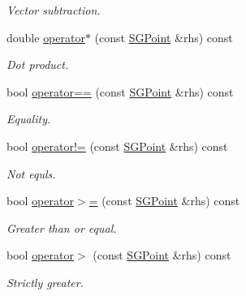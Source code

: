 \begin{DoxyCompactItemize}
\begin{DoxyCompactList}\small\item\em Vector subtraction. \end{DoxyCompactList}\item 
\mbox{\label{classSGPoint_abdbf7e140704b4d843a658ce2c2b2eb5}} 
double \hyperlink{classSGPoint_abdbf7e140704b4d843a658ce2c2b2eb5}{operator$\ast$} (const \hyperlink{classSGPoint}{S\+G\+Point} \&rhs) const
\begin{DoxyCompactList}\small\item\em Dot product. \end{DoxyCompactList}\item 
\mbox{\label{classSGPoint_a5d055a30a15721b88f311f222f9f45f0}} 
bool \hyperlink{classSGPoint_a5d055a30a15721b88f311f222f9f45f0}{operator==} (const \hyperlink{classSGPoint}{S\+G\+Point} \&rhs) const
\begin{DoxyCompactList}\small\item\em Equality. \end{DoxyCompactList}\item 
\mbox{\label{classSGPoint_aef6648aaa0a8cac1d3186aaff0a143c6}} 
bool \hyperlink{classSGPoint_aef6648aaa0a8cac1d3186aaff0a143c6}{operator!=} (const \hyperlink{classSGPoint}{S\+G\+Point} \&rhs) const
\begin{DoxyCompactList}\small\item\em Not equls. \end{DoxyCompactList}\item 
\mbox{\label{classSGPoint_a00f8bdebe0d49e4374f366105ee7e268}} 
bool \hyperlink{classSGPoint_a00f8bdebe0d49e4374f366105ee7e268}{operator$>$=} (const \hyperlink{classSGPoint}{S\+G\+Point} \&rhs) const
\begin{DoxyCompactList}\small\item\em Greater than or equal. \end{DoxyCompactList}\item 
\mbox{\label{classSGPoint_aaba9da86774449a994a23ca3bb52433d}} 
bool \hyperlink{classSGPoint_aaba9da86774449a994a23ca3bb52433d}{operator$>$} (const \hyperlink{classSGPoint}{S\+G\+Point} \&rhs) const
\begin{DoxyCompactList}\small\item\em Strictly greater. \end{DoxyCompactList}\item 

\end{DoxyCompactItemize}
